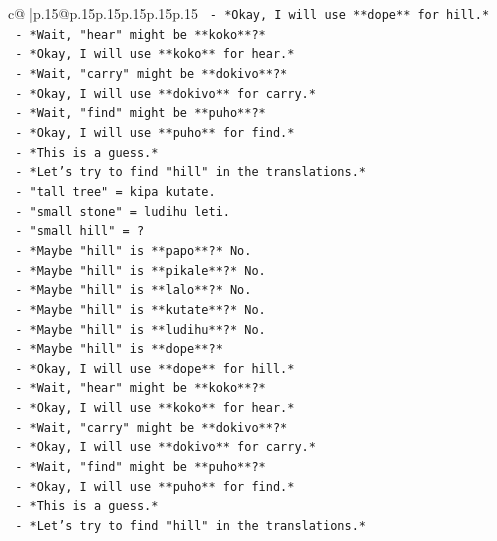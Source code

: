 \documentclass{article}
\begin{document}
{\begin{supertabular}{c@{$\;$}|p{.15\linewidth}@{}p{.15\linewidth}p{.15\linewidth}p{.15\linewidth}p{.15\linewidth}p{.15\linewidth}}
{{{\texttt{       {-} *Okay, I will use **dope** for hill.*} \\
\texttt{       {-} *Wait, "hear" might be **koko**?*} \\
\texttt{       {-} *Okay, I will use **koko** for hear.*} \\
\texttt{       {-} *Wait, "carry" might be **dokivo**?*} \\
\texttt{       {-} *Okay, I will use **dokivo** for carry.*} \\
\texttt{       {-} *Wait, "find" might be **puho**?*} \\
\texttt{       {-} *Okay, I will use **puho** for find.*} \\
\texttt{       {-} *This is a guess.*} \\
\texttt{       {-} *Let's try to find "hill" in the translations.*} \\
\texttt{       {-} "tall tree" = kipa kutate.} \\
\texttt{       {-} "small stone" = ludihu leti.} \\
\texttt{       {-} "small hill" = ?} \\
\texttt{       {-} *Maybe "hill" is **papo**?* No.} \\
\texttt{       {-} *Maybe "hill" is **pikale**?* No.} \\
\texttt{       {-} *Maybe "hill" is **lalo**?* No.} \\
\texttt{       {-} *Maybe "hill" is **kutate**?* No.} \\
\texttt{       {-} *Maybe "hill" is **ludihu**?* No.} \\
\texttt{       {-} *Maybe "hill" is **dope**?*} \\
\texttt{       {-} *Okay, I will use **dope** for hill.*} \\
\texttt{       {-} *Wait, "hear" might be **koko**?*} \\
\texttt{       {-} *Okay, I will use **koko** for hear.*} \\
\texttt{       {-} *Wait, "carry" might be **dokivo**?*} \\
\texttt{       {-} *Okay, I will use **dokivo** for carry.*} \\
\texttt{       {-} *Wait, "find" might be **puho**?*} \\
\texttt{       {-} *Okay, I will use **puho** for find.*} \\
\texttt{       {-} *This is a guess.*} \\
\texttt{       {-} *Let's try to find "hill" in the translations.*} \\
}}}
\end{supertabular}}
\end{document}
